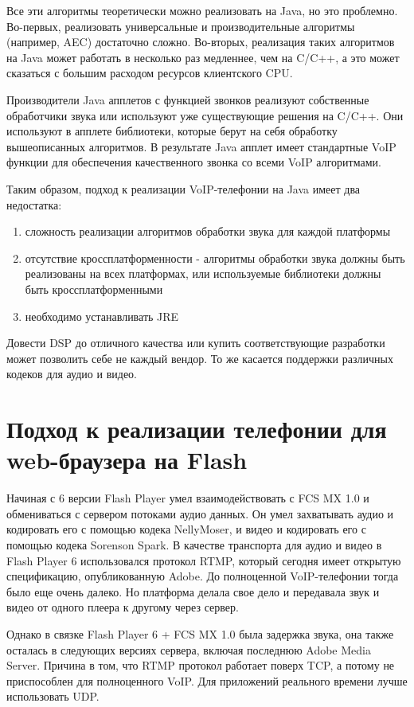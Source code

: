 Все эти алгоритмы теоретически можно реализовать на Java, но это проблемно. Во-первых, реализовать универсальные и производительные алгоритмы (например, AEC) достаточно сложно. Во-вторых, реализация таких алгоритмов на Java может работать в несколько раз медленнее, чем на C/C++, а это может сказаться с большим расходом ресурсов клиентского CPU.

Производители Java апплетов с функцией звонков реализуют собственные обработчики звука или используют уже существующие решения на C/C++. Они используют в апплете библиотеки, которые берут на себя обработку вышеописанных алгоритмов. В результате Java апплет имеет стандартные VoIP функции для обеспечения качественного звонка со всеми VoIP алгоритмами.

Таким образом, подход к реализации VoIP-телефонии на Java имеет два недостатка:
\begin{enumerate}
\item сложность реализации алгоритмов обработки звука для каждой платформы
\item отсутствие кроссплатформенности - алгоритмы обработки звука должны быть реализованы на всех платформах, или используемые библиотеки должны быть кроссплатформенными
\item необходимо устанавливать JRE
\end{enumerate}

Довести DSP до отличного качества или купить соответствующие разработки может позволить себе не каждый вендор. То же касается поддержки различных кодеков для аудио и видео.

\section{Подход к реализации телефонии для web-браузера на Flash}

Начиная с 6 версии Flash Player умел взаимодействовать с FCS MX 1.0 и обмениваться с сервером потоками аудио данных.
Он умел захватывать аудио и кодировать его с помощью кодека NellyMoser, и видео и кодировать его с помощью кодека Sorenson Spark.
В качестве транспорта для аудио и видео в Flash Player 6 использовался протокол RTMP, который сегодня имеет открытую спецификацию, опубликованную Adobe. До полноценной VoIP-телефонии тогда было еще очень далеко. Но платформа делала свое дело и передавала звук и видео от одного плеера к другому через сервер.

Однако в связке Flash Player 6 + FCS MX 1.0 была задержка звука, она также осталась в следующих версиях сервера, включая последнюю Adobe Media Server. Причина в том, что RTMP протокол работает поверх TCP, а потому не приспособлен для полноценного VoIP. Для приложений реального времени лучше использовать UDP.

